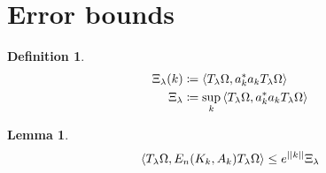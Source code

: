 \documentclass[sn-mathphys,Numbered, a4paper ,nocrop]{sn-jnl}%
\theoremstyle{plain}
\newtheorem{lemma}[theorem]{Lemma}
\theoremstyle{definition}
\newtheorem{definition}[theorem]{Definition}
\theoremstyle{remark}
\theoremstyle{plain}
\theoremstyle{definition}
\theoremstyle{remark}
\begin{document}
\section{Error bounds}
\begin{definition}
    \begin{align}
        \Xi_\lambda(k) &\coloneq \expval{T_\lambda\Omega, a^*_ka_kT_\lambda\Omega}\\
        \Xi_\lambda &\coloneq \sup\limits_{k}\expval{T_\lambda\Omega, a^*_ka_kT_\lambda\Omega}
    \end{align}
\end{definition}
\begin{lemma}
    \begin{equation}
    \expval{T_\lambda\Omega, E_n(K_k,A_k)T_\lambda\Omega}\leq e^{||k||} \Xi_\lambda  
    \end{equation}
    
\end{lemma}






\end{document}
